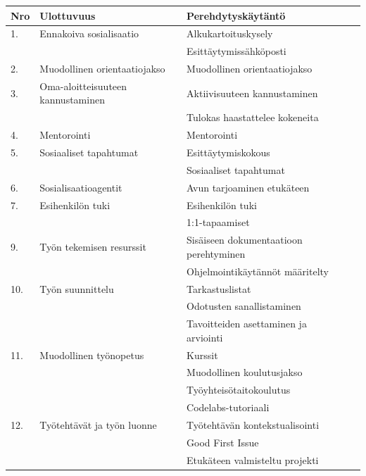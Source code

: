 \documentclass[utf8]{gradu3}
\begin{document}

\begin{table}[h]
    \tiny
    \begin{tabular}{llll}
        \toprule
        \textbf{Nro} & \textbf{Ulottuvuus} & \textbf{Perehdytyskäytäntö} \\
        \toprule
        1. & Ennakoiva sosialisaatio & Alkukartoituskysely \\
        & & Esittäytymissähköposti \\
        \midrule
        2. & Muodollinen orientaatiojakso & Muodollinen orientaatiojakso\\
        \midrule
        3. & Oma-aloitteisuuteen kannustaminen & Aktiivisuuteen kannustaminen \\
        & & Tulokas haastattelee kokeneita \\
        \midrule
        4. & Mentorointi & Mentorointi \\
        \midrule
        5. & Sosiaaliset tapahtumat & Esittäytymiskokous \\
        & & Sosiaaliset tapahtumat\\
        \midrule
        6. & Sosialisaatioagentit & Avun tarjoaminen etukäteen \\
        \midrule
        7. & Esihenkilön tuki & Esihenkilön tuki \\
        & & 1:1-tapaamiset \\
        \midrule
        9. & Työn tekemisen resurssit & Sisäiseen dokumentaatioon perehtyminen \\
        & & Ohjelmointikäytännöt määritelty \\
        \midrule
        10. & Työn suunnittelu & Tarkastuslistat\\
        & & Odotusten sanallistaminen \\
        & & Tavoitteiden asettaminen ja arviointi\\
        \midrule
        11. & Muodollinen työnopetus & Kurssit \\
        & & Muodollinen koulutusjakso \\
        & & Työyhteisötaitokoulutus\\
        & & Codelabs-tutoriaali\\
        \midrule
        12. & Työtehtävät ja työn luonne & Työtehtävän kontekstualisointi \\
        & & Good First Issue \\
        & & Etukäteen valmisteltu projekti \\

\end{tabular}
\end{table}
\end{document}
